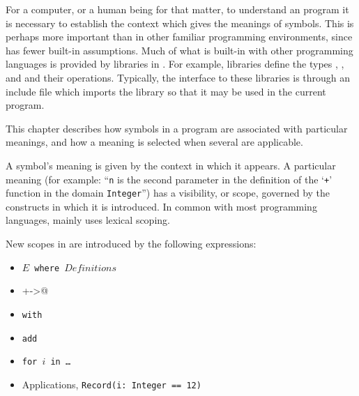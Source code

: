 

For a computer, or a human being for that matter, to understand an \asharp{}
program it is necessary to establish the context which gives the
meanings of symbols.
This is perhaps more important than in other familiar programming
environments, since \asharp{} has fewer built-in assumptions.
Much of what is built-in with other programming languages is provided
by libraries in \asharp{}.  For example, \asharp{} libraries define the types
, , and  and their operations.
Typically, the interface to these libraries is through an include
file which imports the library so that it may be used in the current
program.

This chapter describes how symbols in a program are associated with
particular meanings, and how a meaning is selected when several are
applicable.


A symbol's meaning is given by the context in which it appears. A
particular meaning (for example: ``{\tt n} is the second parameter in
the definition of the `\verb"+"' function in the domain
{\tt Integer}'') has a visibility, or scope, governed by the
constructs in which it is introduced. In common with most
programming languages, \asharp{} mainly uses lexical scoping.

New scopes in \asharp{} are introduced by the following expressions:
\begin{itemize}
\item {\tt $E$ where $Definitions$}
\item {\verb@+->@}
\item {\tt with}
\item {\tt add}
\item {\tt for $i$ in \ldots}
\item Applications, \eg{} \verb"Record(i: Integer == 12)"
\end{itemize}

